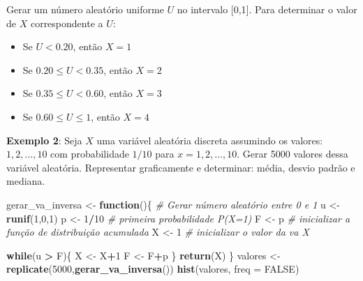 \documentclass[
]{book}
\newenvironment{Shaded}{\begin{snugshade}}{\end{snugshade}}
\newcommand{\AttributeTok}[1]{\textcolor[rgb]{0.13,0.29,0.53}{#1}}
\newcommand{\CommentTok}[1]{\textcolor[rgb]{0.56,0.35,0.01}{\textit{#1}}}
\newcommand{\ConstantTok}[1]{\textcolor[rgb]{0.56,0.35,0.01}{#1}}
\newcommand{\ControlFlowTok}[1]{\textcolor[rgb]{0.13,0.29,0.53}{\textbf{#1}}}
\newcommand{\DecValTok}[1]{\textcolor[rgb]{0.00,0.00,0.81}{#1}}
\newcommand{\FunctionTok}[1]{\textcolor[rgb]{0.13,0.29,0.53}{\textbf{#1}}}
\newcommand{\NormalTok}[1]{#1}
\newcommand{\OtherTok}[1]{\textcolor[rgb]{0.56,0.35,0.01}{#1}}
\newcommand{\SpecialCharTok}[1]{\textcolor[rgb]{0.81,0.36,0.00}{\textbf{#1}}}
\providecommand{\tightlist}{%
  \setlength{\itemsep}{0pt}\setlength{\parskip}{0pt}}
\begin{document}
Gerar um número aleatório uniforme \(U\) no intervalo {[}0,1{]}. Para
determinar o valor de \(X\) correspondente a \(U\):

\begin{itemize}
\tightlist
\item
  Se \(U <0.20\), então \(X=1\)
\item
  Se \(0.20 \leq U < 0.35\), então \(X=2\)
\item
  Se \(0.35\leq U < 0.60\), então \(X=3\)
\item
  Se \(0.60 \leq U \leq 1\), então \(X=4\)
\end{itemize}

\textbf{Exemplo 2}: Seja \(X\) uma variável aleatória discreta assumindo os
valores: \(1,2,\ldots,10\) com probabilidade \(1/10\) para
\(x=1,2,\ldots,10\). Gerar 5000 valores dessa variável aleatória.
Representar graficamente e determinar: média, desvio padrão e mediana.

\begin{Shaded}
\begin{Highlighting}[]
\NormalTok{gerar\_va\_inversa }\OtherTok{\textless{}{-}} \ControlFlowTok{function}\NormalTok{()\{}
  \CommentTok{\# Gerar número aleatório entre 0 e 1}
\NormalTok{  u }\OtherTok{\textless{}{-}} \FunctionTok{runif}\NormalTok{(}\DecValTok{1}\NormalTok{,}\DecValTok{0}\NormalTok{,}\DecValTok{1}\NormalTok{)}
\NormalTok{  p }\OtherTok{\textless{}{-}} \DecValTok{1}\SpecialCharTok{/}\DecValTok{10} \CommentTok{\# primeira probabilidade P(X=1)}
\NormalTok{  F }\OtherTok{\textless{}{-}}\NormalTok{ p }\CommentTok{\# inicializar a função de distribuição acumulada}
\NormalTok{  X }\OtherTok{\textless{}{-}} \DecValTok{1} \CommentTok{\# inicializar o valor da va X}
  
  \ControlFlowTok{while}\NormalTok{(u }\SpecialCharTok{\textgreater{}}\NormalTok{ F)\{}
\NormalTok{    X }\OtherTok{\textless{}{-}}\NormalTok{ X}\SpecialCharTok{+}\DecValTok{1}
\NormalTok{    F }\OtherTok{\textless{}{-}}\NormalTok{ F}\SpecialCharTok{+}\NormalTok{p}
\NormalTok{  \}}
  \FunctionTok{return}\NormalTok{(X)}
\NormalTok{\}}
\NormalTok{valores }\OtherTok{\textless{}{-}} \FunctionTok{replicate}\NormalTok{(}\DecValTok{5000}\NormalTok{,}\FunctionTok{gerar\_va\_inversa}\NormalTok{())}
\FunctionTok{hist}\NormalTok{(valores, }\AttributeTok{freq =} \ConstantTok{FALSE}\NormalTok{)}
\end{Highlighting}
\end{Shaded}
\end{document}
